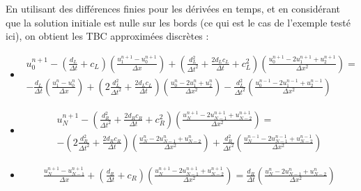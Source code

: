 \indent En utilisant des différences finies pour les dérivées en temps, et en considérant que la solution initiale est nulle sur les bords (ce qui est le cas de l'exemple testé ici), on obtient les TBC approximées discrètes : 

\begingroup
\footnotesize
\begin{itemize}
 \item \begin{equation*}
\label{eq:appDiscTBCP1}
	\begin{aligned}
    u_0^{n+1} - \left( \frac{d_L}{\Delta t} + c_L \right) \left( \frac{u_1^{n+1} - u_0^{n+1}}{\Delta x}\right) +   \left( \frac{d_L^2}{\Delta t^2} + \frac{2d_Lc_L}{\Delta t} + c_L^2  \right) \left(  \frac{u_0^{n+1} - 2u_1^{n+1} + u_2^{n+1}}{\Delta x^2} \right)  = \\
        -\frac{d_L}{\Delta t}\left( \frac{u_1^{n} - u_0^{n}}{\Delta x}\right) +  \left( 2\frac{d_L^2}{\Delta t^2} + \frac{2d_Lc_L}{\Delta t}\right) \left(  \frac{u_0^{n} - 2u_1^n + u_2^{n}}{\Delta x^2} \right)    -  \frac{d_L^2}{\Delta t^2} \left(  \frac{u_0^{n-1} - 2u_1^{n-1} + u_2^{n-1}}{\Delta x^2} \right)
   \end{aligned}
\end{equation*} 

\item \begin{equation*}
	\begin{aligned}
    u_N^{n+1} - \left( \frac{d_R^2}{\Delta t^2} + \frac{2d_Rc_R}{\Delta t} + c_R^2  \right) \left(  \frac{u_{N}^{n+1} - 2u_{N-1}^{n+1} + u_{N-2}^{n+1}}{\Delta x^2} \right) = \\
     -\left( 2\frac{d_R^2}{\Delta t^2} + \frac{2d_Rc_R}{\Delta t}\right) \left(  \frac{u_N^{n} - 2u_{N-1}^n + u_{N-2}^{n}}{\Delta x^2} \right) + \frac{d_R^2}{\Delta t^2} \left(  \frac{u_N^{n-1} - 2u_{N-1}^{n-1} + u_{N-2}^{n-1}}{\Delta x^2} \right)
    \end{aligned}
\end{equation*} 
   
\item \begin{equation*}
	\begin{aligned}	
    \frac{u_N^{n+1} - u_{N-1}^{n+1}}{\Delta x} + \left( \frac{d_R}{\Delta t} + c_R \right) \left( \frac{u_N^{n+1} -2 u_{N-1}^{n+1} + u_{N-2}^{n+1}}{\Delta x^2}\right) =      \frac{d_R}{\Delta t}\left( \frac{u_{N}^{n} - 2u_{N-1}^{n} + u_{N-2}^n}{\Delta x^2}\right)
    \end{aligned}
\end{equation*}

\end{itemize}

